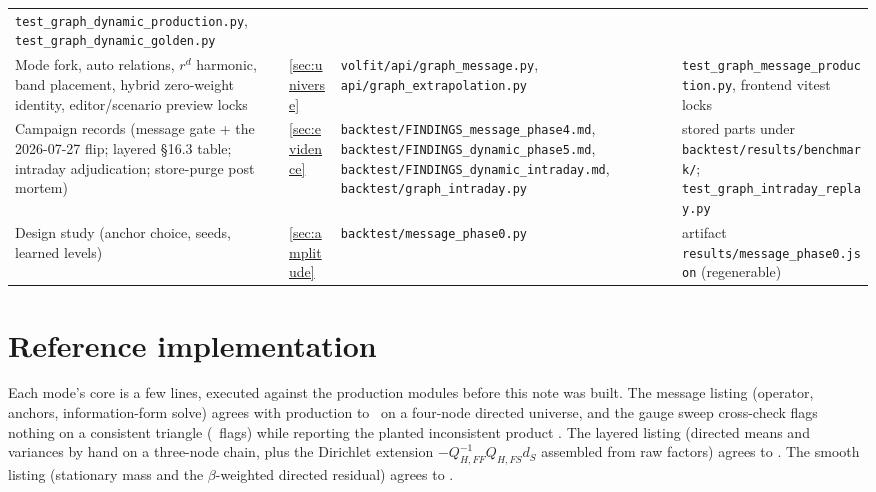 \documentclass[11pt]{article}
\begin{document}
\begin{longtable}{@{}p{}p{}p{}p{}@{}}
\nolinkurl{test_graph_dynamic_production.py},
\nolinkurl{test_graph_dynamic_golden.py}\\
Mode fork, auto relations, $r^d$ harmonic, band placement, hybrid
zero-weight identity, editor/scenario preview locks &
\cref{sec:universe} &
\nolinkurl{volfit/api/graph_message.py},
\nolinkurl{api/graph_extrapolation.py} &
\nolinkurl{test_graph_message_production.py}, frontend vitest locks\\
Campaign records (message gate + the 2026-07-27 flip; layered §16.3
table; intraday adjudication; store-purge post
mortem) &
\cref{sec:evidence} &
\nolinkurl{backtest/FINDINGS_message_phase4.md},
\nolinkurl{backtest/FINDINGS_dynamic_phase5.md},
\nolinkurl{backtest/FINDINGS_dynamic_intraday.md},
\nolinkurl{backtest/graph_intraday.py} &
stored parts under \nolinkurl{backtest/results/benchmark/};
\nolinkurl{test_graph_intraday_replay.py}\\
Design study (anchor choice, seeds, learned levels) &
\cref{sec:amplitude} &
\nolinkurl{backtest/message_phase0.py} &
artifact \nolinkurl{results/message_phase0.json} (regenerable)\\
\bottomrule
\end{longtable}
\endgroup

\section{Reference implementation}
\label{app:ref}

Each mode's core is a few lines, executed against the production modules
before this note was built.  The message listing (operator, anchors,
information-form solve) agrees with production to \gtprefagreemsg\ on a
four-node directed universe, and the gauge sweep cross-check flags
nothing on a consistent triangle (\gtpcycleflags\ flags) while reporting
the planted inconsistent product \gtpcyclebad.  The layered listing
(directed means and variances by hand on a three-node chain, plus the
Dirichlet extension $-Q_{H,FF}^{-1}Q_{H,FS}d_S$ assembled from raw
factors) agrees to \gtprefagreelay.  The smooth listing (stationary mass
and the $\beta$-weighted directed residual) agrees to \gtprefagreesm.
\end{document}
